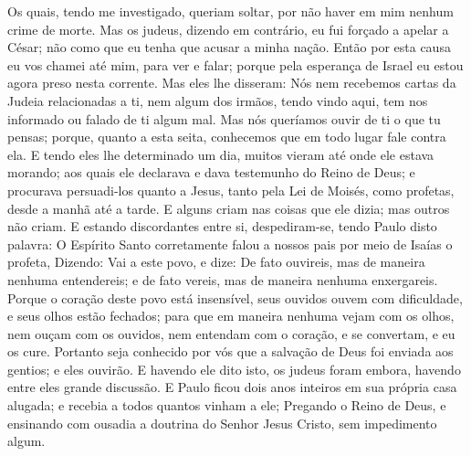 {  Os quais, tendo me investigado, queriam
{} soltar, por não haver em mim nenhum crime de morte.
  Mas os judeus, dizendo em contrário, eu fui forçado a apelar a César;
{} não como que eu tenha que acusar a minha nação.
  Então por esta causa eu vos chamei até mim, para
{} ver e falar; porque pela esperança de Israel eu estou agora preso nesta corrente.
  Mas eles lhe disseram: Nós nem recebemos cartas da Judeia relacionadas a ti, nem algum dos irmãos, tendo vindo aqui, tem nos informado ou falado de ti algum mal.
  Mas nós queríamos ouvir de ti o que tu pensas; porque, quanto a esta seita, conhecemos que em todo lugar
{} fale contra ela.
  E tendo eles lhe determinado um dia, muitos vieram até onde ele estava morando; aos quais ele declarava e dava testemunho do Reino de Deus; e procurava persuadi-los quanto a Jesus, tanto pela Lei de Moisés, como
{} profetas, desde a manhã até a tarde.
  E alguns criam nas coisas que ele dizia; mas outros não criam.
  E estando discordantes entre si, despediram-se, tendo Paulo disto
{} palavra: O Espírito Santo corretamente falou a nossos pais por meio de Isaías o profeta,
  Dizendo: Vai a este povo, e dize: De fato ouvireis, mas de maneira nenhuma entendereis; e de fato vereis, mas de maneira nenhuma enxergareis.
  Porque o coração deste povo está insensível, seus ouvidos ouvem com dificuldade, e seus olhos estão fechados; para que em maneira nenhuma vejam com os olhos, nem ouçam com os ouvidos, nem entendam com o coração, e se convertam, e eu os cure.
  Portanto seja conhecido por vós que a salvação de Deus foi enviada aos gentios; e eles
{} ouvirão.
  E havendo ele dito isto, os judeus foram embora, havendo entre eles grande discussão.
  E Paulo ficou dois anos inteiros em sua própria casa alugada; e recebia a todos quantos vinham a ele;
  Pregando o Reino de Deus, e ensinando com ousadia a doutrina do Senhor Jesus Cristo, sem impedimento algum.\par }


